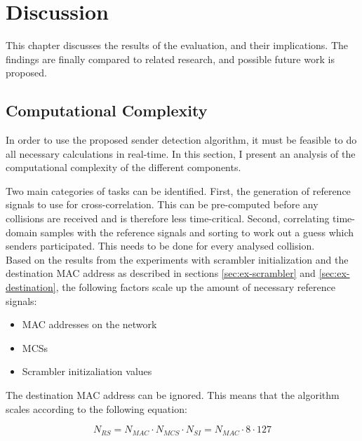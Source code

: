 
\chapter{Discussion}\label{ch:Discussion}
\glsresetall %

This chapter discusses the results of the evaluation, and their implications. The findings are finally compared to related research, and possible future work is proposed.



\section{Computational Complexity}\label{sec:complexity}

In order to use the proposed sender detection algorithm, it must be feasible to do all necessary calculations in real-time. In this section, I present an analysis of the computational complexity of the different components.

Two main categories of tasks can be identified. First, the generation of reference signals to use for cross-correlation. This can be pre-computed before any collisions are received and is therefore less time-critical. Second, correlating time-domain samples with the reference signals and sorting to work out a guess which senders participated. This needs to be done for every analysed collision.\\

Based on the results from the experiments with scrambler initialization and the destination MAC address as described in sections \ref{sec:ex-scrambler} and \ref{sec:ex-destination}, the following factors scale up the amount of necessary reference signals:

\begin{itemize}
  \item MAC addresses on the network
  \item \glspl{MCS}
  \item Scrambler initizaliation values
\end{itemize}

The destination MAC address can be ignored. This means that the algorithm scales according to the following equation:

$$ N_{RS} = N_{MAC} \cdot N_{MCS} \cdot N_{SI} = N_{MAC} \cdot 8 \cdot 127 $$\vspace{0cm}

